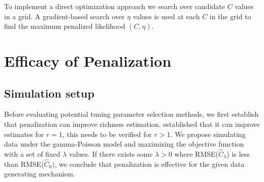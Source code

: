 \documentclass[oupdraft]{bio}
\begin{document}
To implement a direct optimization approach we search over candidate $C$ values in a grid.  A gradient-based search over $\eta$ values is used at each $C$ in the grid to find the maximum penalized likelihood  $(C, \eta)$.

\section{Efficacy of Penalization}
\label{sec:efficacy_sims}
\subsection{Simulation setup}

Before evaluating potential tuning parameter selection methods, we first establish that penalization can improve richness estimation.  \citet{wang_2005} established that it can improve estimates for $r = 1$, this needs to be verified for $r> 1$.
We propose simulating data under the gamma-Poisson model and maximizing the objective function with a set of fixed $\lambda$ values.  If there exists some $\lambda > 0$ where RMSE($\widehat{C}_{\lambda}$) is less than RMSE($\widehat{C}_0)$, we conclude that penalization is effective for the given data generating mechanism.
\end{document}
